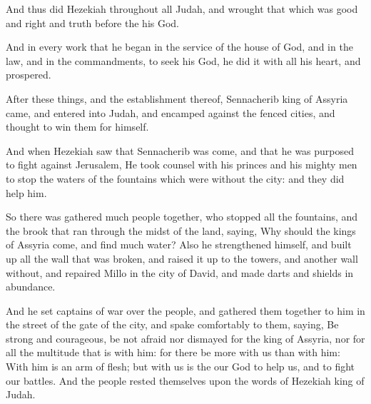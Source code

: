 \Verse And thus did Hezekiah throughout all Judah, and wrought that which was good and right and truth before the \LORD his God.

\Verse And in every work that he began in the service of the house of God, and in the law, and in the commandments, to seek his God, he did it with all his heart, and prospered.


\Chapter
\Verse After these things, and the establishment thereof, Sennacherib king of Assyria came, and entered into Judah, and encamped against the fenced cities, and thought to win them for himself.

\Verse And when Hezekiah saw that Sennacherib was come, and that he was purposed to fight against Jerusalem, \Verse He took counsel with his princes and his mighty men to stop the waters of the fountains which were without the city: and they did help him.

\Verse So there was gathered much people together, who stopped all the fountains, and the brook that ran through the midst of the land, saying, Why should the kings of Assyria come, and find much water?  \Verse Also he strengthened himself, and built up all the wall that was broken, and raised it up to the towers, and another wall without, and repaired Millo in the city of David, and made darts and shields in abundance.

\Verse And he set captains of war over the people, and gathered them together to him in the street of the gate of the city, and spake comfortably to them, saying, \Verse Be strong and courageous, be not afraid nor dismayed for the king of Assyria, nor for all the multitude that is with him: for there be more with us than with him: \Verse With him is an arm of flesh; but with us is the \LORD our God to help us, and to fight our battles. And the people rested themselves upon the words of Hezekiah king of Judah.

